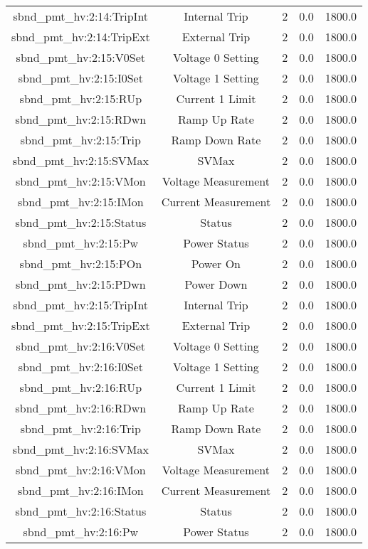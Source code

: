 \begin{table}[ptb]
\begin{tabular}{c | c c c c}
sbnd_pmt_hv:2:14:TripInt & Internal Trip & 2 & 0.0 & 1800.0\\ 
sbnd_pmt_hv:2:14:TripExt & External Trip & 2 & 0.0 & 1800.0\\ 
sbnd_pmt_hv:2:15:V0Set & Voltage 0 Setting & 2 & 0.0 & 1800.0\\ 
sbnd_pmt_hv:2:15:I0Set & Voltage 1 Setting & 2 & 0.0 & 1800.0\\ 
sbnd_pmt_hv:2:15:RUp & Current 1 Limit & 2 & 0.0 & 1800.0\\ 
sbnd_pmt_hv:2:15:RDwn & Ramp Up Rate & 2 & 0.0 & 1800.0\\ 
sbnd_pmt_hv:2:15:Trip & Ramp Down Rate & 2 & 0.0 & 1800.0\\ 
sbnd_pmt_hv:2:15:SVMax & SVMax & 2 & 0.0 & 1800.0\\ 
sbnd_pmt_hv:2:15:VMon & Voltage Measurement & 2 & 0.0 & 1800.0\\ 
sbnd_pmt_hv:2:15:IMon & Current Measurement & 2 & 0.0 & 1800.0\\ 
sbnd_pmt_hv:2:15:Status & Status & 2 & 0.0 & 1800.0\\ 
sbnd_pmt_hv:2:15:Pw & Power Status & 2 & 0.0 & 1800.0\\ 
sbnd_pmt_hv:2:15:POn & Power On & 2 & 0.0 & 1800.0\\ 
sbnd_pmt_hv:2:15:PDwn & Power Down & 2 & 0.0 & 1800.0\\ 
sbnd_pmt_hv:2:15:TripInt & Internal Trip & 2 & 0.0 & 1800.0\\ 
sbnd_pmt_hv:2:15:TripExt & External Trip & 2 & 0.0 & 1800.0\\ 
sbnd_pmt_hv:2:16:V0Set & Voltage 0 Setting & 2 & 0.0 & 1800.0\\ 
sbnd_pmt_hv:2:16:I0Set & Voltage 1 Setting & 2 & 0.0 & 1800.0\\ 
sbnd_pmt_hv:2:16:RUp & Current 1 Limit & 2 & 0.0 & 1800.0\\ 
sbnd_pmt_hv:2:16:RDwn & Ramp Up Rate & 2 & 0.0 & 1800.0\\ 
sbnd_pmt_hv:2:16:Trip & Ramp Down Rate & 2 & 0.0 & 1800.0\\ 
sbnd_pmt_hv:2:16:SVMax & SVMax & 2 & 0.0 & 1800.0\\ 
sbnd_pmt_hv:2:16:VMon & Voltage Measurement & 2 & 0.0 & 1800.0\\ 
sbnd_pmt_hv:2:16:IMon & Current Measurement & 2 & 0.0 & 1800.0\\ 
sbnd_pmt_hv:2:16:Status & Status & 2 & 0.0 & 1800.0\\ 
sbnd_pmt_hv:2:16:Pw & Power Status & 2 & 0.0 & 1800.0\\ 

\end{tabular}
\end{table}
